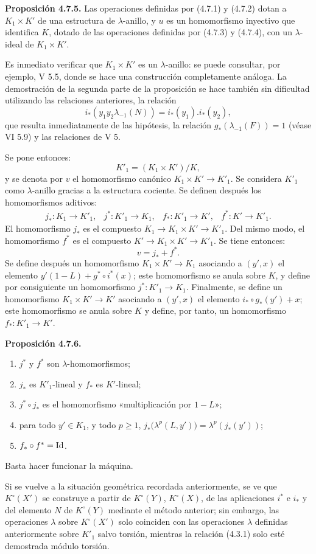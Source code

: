 \textbf{Proposición 4.7.5.} Las operaciones definidas por (4.7.1) y (4.7.2) dotan a \(K_1\times K'\) de una estructura de \(\lambda\)-anillo, y \(u\) es un homomorfismo inyectivo que identifica \(K\), dotado de las operaciones definidas por (4.7.3) y (4.7.4), con un \(\lambda\)-ideal de \(K_1\times K'\).

Es inmediato verificar que \(K_1\times K'\) es un \(\lambda\)-anillo: se puede consultar, por ejemplo, V 5.5, donde se hace una construcción completamente análoga. La demostración de la segunda parte de la proposición se hace también sin dificultad utilizando las relaciones anteriores, la relación
\[
  i_*(y_1y_2\lambda_{-1}(N))=i_*(y_1).i_*(y_2),
\]
que resulta inmediatamente de las hipótesis, la relación \(g_*(\lambda_{-1}(F))=1\) (véase VI 5.9) y las relaciones de V 5.

Se pone entonces:
\[
  K'_1=(K_1\times K')/K,
\]
y se denota por \(v\) el homomorfismo canónico \(K_1\times K'\to K'_1\). Se considera \(K'_1\) como \(\lambda\)-anillo gracias a la estructura cociente. Se definen después los homomorfismos aditivos:
\[
\begin{array}{llll}
j_*:K_1\to K'_1, & j^*:K'_1\to K_1, &
f_*:K'_1\to K', & f^*:K'\to K'_1 .
\end{array}
\]
El homomorfismo \(j_*\) es el compuesto \(K_1\to K_1\times K'\to K'_1\). Del mismo modo, el homomorfismo \(f^*\) es el compuesto \(K'\to K_1\times K'\to K'_1\). Se tiene entonces:
\[
  v=j_*+f^*.
\]
Se define después un homomorfismo \(K_1\times K'\to K_1\) asociando a \((y',x)\) el elemento \(y'(1-L)+g^*\circ i^*(x)\); este homomorfismo se anula sobre \(K\), y define por consiguiente un homomorfismo \(j^*:K'_1\longrightarrow K_1\). Finalmente, se define un homomorfismo \(K_1\times K'\to K'\) asociando a \((y',x)\) el elemento \(i_*\circ g_*(y')+x\); este homomorfismo se anula sobre \(K\) y define, por tanto, un homomorfismo \(f_*:K'_1\longrightarrow K'\).

\textbf{Proposición 4.7.6.}
\begin{enumerate}[label=\roman*)]
\item \(j^*\) y \(f^*\) son \(\lambda\)-homomorfismos;
\item \(j_*\) es \(K'_1\)-lineal y \(f_*\) es \(K'\)-lineal;
\item \(j^*\circ j_*\) es el homomorfismo «multiplicación por \(1-L\)»;
\item para todo \(y'\in K_1\), y todo \(p\ge1\), \(j_*\bigl(\lambda^p(L,y')\bigr)=\lambda^p(j_*(y'))\);
\item \(f_*\circ f^*=\operatorname{Id}\).
\end{enumerate}
Basta hacer funcionar la máquina.

Si se vuelve a la situación geométrica recordada anteriormente, se ve que \(K^\circ(X')\) se construye a partir de \(K^\circ(Y)\), \(K^\circ(X)\), de las aplicaciones \(i^*\) e \(i_*\) y del elemento \(N\) de \(K^\circ(Y)\) mediante el método anterior; sin embargo, las operaciones \(\lambda\) sobre \(K^\circ(X')\) solo coinciden con las operaciones \(\lambda\) definidas anteriormente sobre \(K'_1\) salvo torsión, mientras la relación (4.3.1) solo esté demostrada módulo torsión.
